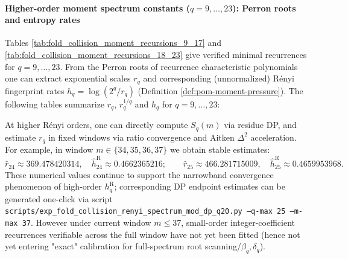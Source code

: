 




\paragraph{Higher-order moment spectrum constants (\texorpdfstring{$q=9,\dots,23$}{q=9..23}): Perron roots and entropy rates}
Tables \ref{tab:fold_collision_moment_recursions_9_17} and \ref{tab:fold_collision_moment_recursions_18_23} give verified minimal recurrences for \(q=9,\dots,23\).
From the Perron roots of recurrence characteristic polynomials one can extract exponential scales \(r_q\) and corresponding (unnormalized) Rényi fingerprint rates
\(
h_q=\log(2^q/r_q)
\)
(Definition \ref{def:pom-moment-pressure}).
The following tables summarize \(r_q\), \(r_q^{1/q}\) and \(h_q\) for \(q=9,\dots,23\):


\begin{remark}[Higher-order DP endpoint fingerprints (\(q=24,25\))]\label{rem:pom-renyi-endpoint-q24-25}
At higher Rényi orders, one can directly compute \(S_q(m)\) via residue DP, and estimate \(r_q\) in fixed windows via ratio convergence and Aitken \(\Delta^2\) acceleration.
For example, in window \(m\in\{34,35,36,37\}\) we obtain stable estimates:
\[
\widehat r_{24}\approx 369.478420314,\quad \widehat h_{24}^{\mathrm R}\approx 0.4662365216;\qquad
\widehat r_{25}\approx 466.281715009,\quad \widehat h_{25}^{\mathrm R}\approx 0.4659953968.
\]
These numerical values continue to support the narrowband convergence phenomenon of high-order \(h_q^{\mathrm R}\); corresponding DP endpoint estimates can be generated one-click via script
\texttt{scripts/exp\_fold\_collision\_renyi\_spectrum\_mod\_dp\_q20.py --q-max 25 --m-max 37}.
However under current window \(m\le 37\), small-order integer-coefficient recurrences verifiable across the full window have not yet been fitted (hence not yet entering "exact" calibration for full-spectrum root scanning/\(\beta_q,\delta_q\)).
\end{remark}






